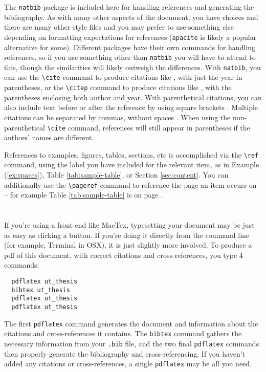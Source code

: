 The {\tt natbib} package is included here for handling references and
generating the bibliography. As with many other aspects of the document, you
have choices and there are many other style files and you may prefer to use
something else depending on formatting expectations for references
({\tt apacite} is likely a popular alternative for some). Different packages
have their own commands for handling references, so if you use
something other than {\tt natbib} you will have to attend to this, though
the similarities will likely outweigh the differences. With {\tt natbib},
you can use the \verb+\cite+ command to produce citations like 
\cite{baayen:2008}, with just the year in parentheses, or the \verb+\citep+
command to produce citations like \citep{gaylord:2013}, with the parentheses
enclosing both author and year. With parenthetical citations, you can also
include text before or after the reference by using square brackets
\citep[for example][and others]{kilgarriff:2004}. Multiple citations can be 
separated by commas, without spaces \citep{cruse:2000,klepousniotou:2008}. 
When using the non-parenthetical \verb+\cite+ command, references will still 
appear in parentheses if the authors' names are different.

References to examples, figures, tables, sections, etc is accomplished via the
\verb+\ref+ command, using the label you have included for the relevant item,
as in Example (\ref{ex:spaces}), Table \ref{tab:sample-table}, or Section
\ref{sec:content}. You can additionally use the \verb+\pageref+ command to
reference the page an item occurs on -- for example Table \ref{tab:sample-table}
is on page \pageref{tab:sample-table}.

\section{}

If you're using a front end like MacTex, typesetting your document may be
just as easy as clicking a button. If you're doing it directly from the 
command line (for example, Terminal in OSX), it is just slightly more involved.
To produce a pdf of this document, with correct citations and cross-references,
you type 4 commands:

\begin{verbatim}
  pdflatex ut_thesis
  bibtex ut_thesis
  pdflatex ut_thesis
  pdflatex ut_thesis
\end{verbatim}
%
The first {\tt pdflatex} command generates the document and information 
about the citations and cross-references it contains. The {\tt bibtex} command 
gathers the necessary information from your {\tt .bib} file, and the two final
{\tt pdflatex} commands then properly generate the bibliography and
cross-referencing. If you haven't added any citations or cross-references,
a single {\tt pdflatex} may be all you need.

